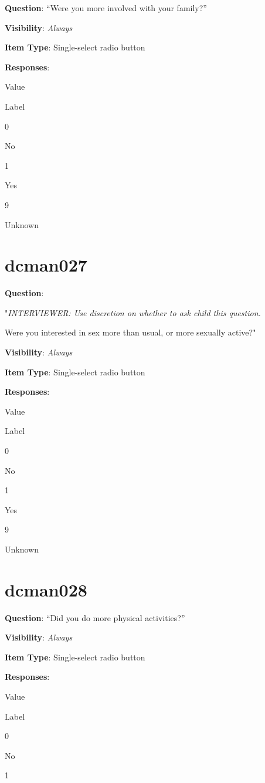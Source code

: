 \documentclass[]{book}
\begin{document}
\textbf{Question}: ``Were you more involved with your family?''

\textbf{Visibility}: \emph{Always}

\textbf{Item Type}: Single-select radio button

\textbf{Responses}:

Value

Label

0

No

1

Yes

9

Unknown

\hypertarget{dcman027}{%
\section{dcman027}\label{dcman027}}

\textbf{Question}:

"\emph{INTERVIEWER: Use discretion on whether to ask child this question.}

Were you interested in sex more than usual, or more sexually active?"

\textbf{Visibility}: \emph{Always}

\textbf{Item Type}: Single-select radio button

\textbf{Responses}:

Value

Label

0

No

1

Yes

9

Unknown

\hypertarget{dcman028}{%
\section{dcman028}\label{dcman028}}

\textbf{Question}: ``Did you do more physical activities?''

\textbf{Visibility}: \emph{Always}

\textbf{Item Type}: Single-select radio button

\textbf{Responses}:

Value

Label

0

No

1
\end{document}
